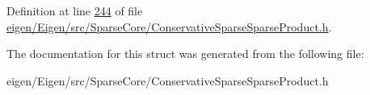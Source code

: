 Definition at line \hyperlink{eigen_2_eigen_2src_2_sparse_core_2_conservative_sparse_sparse_product_8h_source_l00244}{244} of file \hyperlink{eigen_2_eigen_2src_2_sparse_core_2_conservative_sparse_sparse_product_8h_source}{eigen/\+Eigen/src/\+Sparse\+Core/\+Conservative\+Sparse\+Sparse\+Product.\+h}.



The documentation for this struct was generated from the following file\+:\begin{DoxyCompactItemize}
\item 
eigen/\+Eigen/src/\+Sparse\+Core/\+Conservative\+Sparse\+Sparse\+Product.\+h\end{DoxyCompactItemize}
